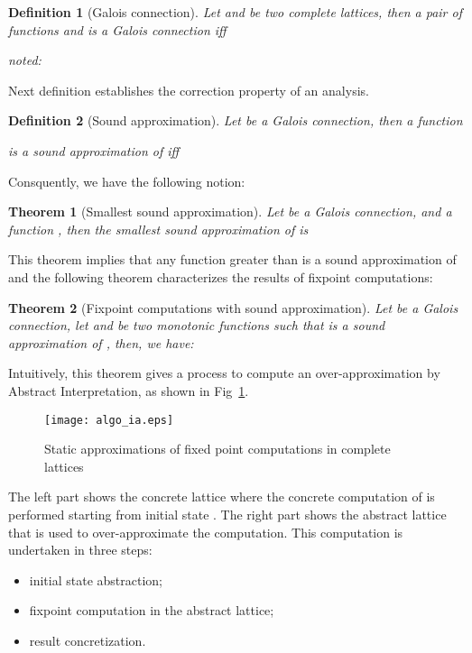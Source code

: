 \documentclass[submission,copyright,creativecommons]{eptcs}
\newtheorem{definition}{Definition}
\newtheorem{theorem}{Theorem}
\begin{document}
\begin{definition}[Galois connection]
Let   
and  be two complete lattices,
then a pair of functions
 and
 is a {\it Galois connection} iff

noted:
\begin{center}

\end{center}
\end{definition}
\noindent
Next definition establishes the correction property of an analysis.
\begin{definition}[Sound approximation]\label{correct-app}
Let 
 be a Galois connection, then a function

is a {\it sound approximation} of  iff

\end{definition}
\noindent
Consquently, we have the following notion:
\begin{theorem} [Smallest sound approximation]
 \label{theo:approx}
Let  be a Galois connection,
and a function , then the {\it smallest sound approximation} of 
is 
\end{theorem}
\noindent
This theorem implies that any function greater than
 is a sound approximation of  and
the following theorem characterizes the results of fixpoint computations:
\begin{theorem}[Fixpoint computations with sound approximation]
  Let  be
a Galois connection, let  and  
be two monotonic functions such that  is a sound approximation of , 
then, we have:

\end{theorem}
\noindent
Intuitively, this theorem gives a process to compute an over-approximation by
Abstract Interpretation, as shown in Fig~\ref{fig:algo_ia}.
\begin{figure}
\begin{center}
  \texttt{[image: algo\_ia.eps]}
\end{center}
\caption{Static approximations of fixed point computations in complete lattices}
\label{fig:algo_ia}
\end{figure}
The left part shows the concrete lattice where the concrete computation of 
is performed starting from initial state . The right part shows the
abstract lattice that is used to over-approximate the computation.
This computation is undertaken in three steps:
\begin{itemize}
\item initial state abstraction;
\item fixpoint computation in the abstract lattice;
\item result concretization.
\end{itemize}
 
\end{document}
